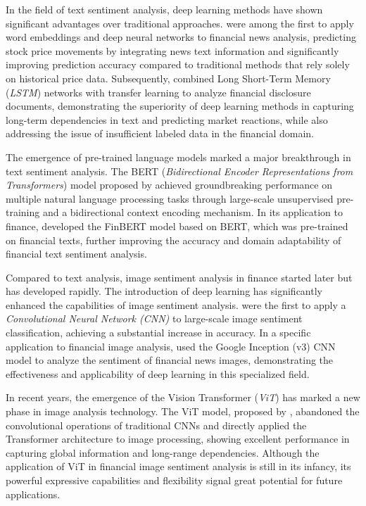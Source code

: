 \documentclass[AER]{AEA}
\begin{document}
In the field of text sentiment analysis, deep learning methods have shown significant advantages over traditional approaches. \citet{peng2015leverage} were among the first to apply word embeddings and deep neural networks to financial news analysis, predicting stock price movements by integrating news text information and significantly improving prediction accuracy compared to traditional methods that rely solely on historical price data. Subsequently, \citet{kraus2017decision} combined Long Short-Term Memory (\textit{LSTM}) networks with transfer learning to analyze financial disclosure documents, demonstrating the superiority of deep learning methods in capturing long-term dependencies in text and predicting market reactions, while also addressing the issue of insufficient labeled data in the financial domain.

The emergence of pre-trained language models marked a major breakthrough in text sentiment analysis. The BERT (\textit{Bidirectional Encoder Representations from Transformers}) model proposed by \citet{devlin2018bert} achieved groundbreaking performance on multiple natural language processing tasks through large-scale unsupervised pre-training and a bidirectional context encoding mechanism. In its application to finance, \citet{yang2020finbert} developed the FinBERT model based on BERT, which was pre-trained on financial texts, further improving the accuracy and domain adaptability of financial text sentiment analysis.

Compared to text analysis, image sentiment analysis in finance started later but has developed rapidly. The introduction of deep learning has significantly enhanced the capabilities of image sentiment analysis. \citet{you2015robust} were the first to apply a \textit{Convolutional Neural Network (CNN)} to large-scale image sentiment classification, achieving a substantial increase in accuracy. In a specific application to financial image analysis, \citet{obaid2022picture} used the Google Inception (v3) CNN model to analyze the sentiment of financial news images, demonstrating the effectiveness and applicability of deep learning in this specialized field.

In recent years, the emergence of the Vision Transformer (\textit{ViT}) has marked a new phase in image analysis technology. The ViT model, proposed by \citet{dosovitskiy2020image}, abandoned the convolutional operations of traditional CNNs and directly applied the Transformer architecture to image processing, showing excellent performance in capturing global information and long-range dependencies. Although the application of ViT in financial image sentiment analysis is still in its infancy, its powerful expressive capabilities and flexibility signal great potential for future applications.
\end{document}

